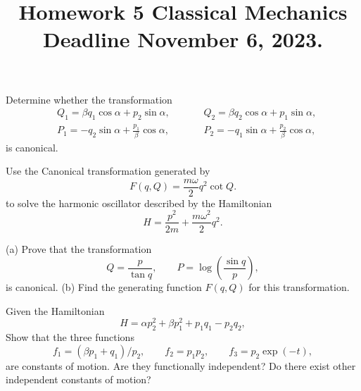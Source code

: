 \documentclass[12pt]{article}
\newenvironment{problem}[2][Problem]{\begin{trivlist}
\item[\hskip \labelsep {\bfseries #1}\hskip \labelsep {\bfseries #2.}]}{\end{trivlist}}
\begin{document}
 
 
\title{Homework 5 Classical Mechanics\\Deadline November 6, 2023.}
\date{}
 
\maketitle


\begin{problem}{1}
Determine whether the transformation
 \begin{align}
&Q_1=\beta q_1\cos\alpha+ p_2\sin\alpha,&\quad&
&Q_2=\beta q_2\cos\alpha + p_1\sin\alpha,\\
&P_1=-q_2\sin\alpha+\frac{p_1}{\beta}\cos \alpha,&\quad&
&P_2=-q_1\sin\alpha +\frac{p_2}{\beta}\cos\alpha ,
\end{align}
is canonical.
\end{problem}


\begin{problem}{2}
Use the Canonical transformation generated by
\begin{equation}
F(q,Q)= \frac{m\omega}{2}q^2 \cot Q.
\end{equation}
 to solve the harmonic oscillator described by the Hamiltonian
\begin{equation}
H= \frac{p^2}{2m}+\frac{m\omega^2}{2} q^2.
\end{equation}
\end{problem}

\begin{problem}{3}
(a) Prove that the transformation
\begin{equation}
Q =\frac{p}{\tan q},\qquad
P = \log\left(\frac{\sin q}{p}\right),
\end{equation}
is canonical. (b) Find the generating function $F(q, Q)$ for this transformation.
\end{problem}

\begin{problem}{4}
Given the Hamiltonian
\begin{equation}
H=\alpha p_2^2 + \beta p_1^2 + p_1 q_1 - p_2 q_2,
\end{equation}
Show that the three functions
\begin{equation}
f_1=(\beta p_1 + q_1)/p_2,\qquad
f_2=p_1 p_2,\qquad
f_3=p_2 \exp(-t),
\end{equation}
are constants of motion.  Are they functionally independent? Do there exist other
independent constants of motion? 
\end{problem}
\end{document}
